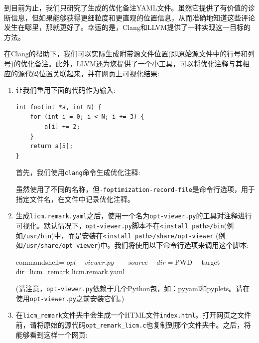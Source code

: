 到目前为止，我们只研究了生成的优化备注YAML文件。虽然它提供了有价值的诊断信息，但如果能够获得更细粒度和更直观的位置信息，从而准确地知道这些评论发生在哪里，那就更好了。幸运的是，Clang和LLVM提供了一种实现这一目标的方法。

在Clang的帮助下，我们可以实际生成附带源文件位置(即原始源文件中的行号和列号)的优化备注。此外，LLVM还为您提供了一个小工具，可以将优化注释与其相应的源代码位置关联起来，并在网页上可视化结果:

\begin{enumerate}
\item 让我们重用下面的代码作为输入:

\begin{lstlisting}[style=styleCXX]
int foo(int *a, int N) {
	for (int i = 0; i < N; i += 3) {
		a[i] += 2;
	}
	return a[5];
}
\end{lstlisting}

首先，我们使用\texttt{clang}命令生成优化注释:


虽然使用了不同的名称，但\texttt{-foptimization-record-file}是命令行选项，用于指定文件名，在文件中记录优化注释。

\item 生成\texttt{licm.remark.yaml}之后，使用一个名为\texttt{opt-viewer.py}的工具对注释进行可视化。默认情况下，\texttt{opt-viewer.py}脚本不在\texttt{<install path>/bin}(例如\texttt{/usr/bin})中，而是安装在\texttt{<install path>/share/opt-viewer} (例如\texttt{/usr/share/opt-viewer})中。我们将使用以下命令行选项来调用这个脚本:

\begin{tcblisting}{commandshell={}}
$ opt-viewer.py --source-dir=$PWD \
--target-dir=licm_remark licm.remark.yaml
\end{tcblisting}

(请注意，\texttt{opt-viewer.py}依赖于几个Python包，如：pyyaml和pyplets。请在使用\texttt{opt-viewer.py}之前安装它们。)

\item 在\texttt{licm\_remark}文件夹中会生成一个HTML文件\texttt{index.html}。打开网页之文件前，请将原始的源代码\texttt{opt\_remark\_licm.c}也复制到那个文件夹中。之后，将能够看到这样一个网页:


\end{enumerate}
